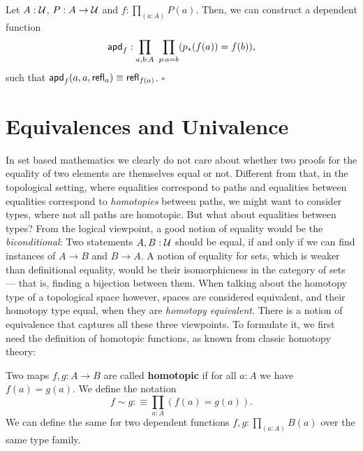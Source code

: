 \begin{lemma}
Let $A : \mathcal{U}$, $P : A \to \mathcal{U}$ and $f : \prod_{(a : A)} P(a)$. Then, we can construct
a dependent function
\begin{equation*}
\mathsf{apd}_f : \prod_{a, b : A} ~ \prod_{p : a = b} (p_*(f(a)) = f(b)) \text{,}
\end{equation*}
such that $\mathsf{apd}_f(a, a, \mathsf{refl}_a) \equiv \mathsf{refl}_{f(a)}$. \hfill $\square$
\end{lemma}

\section{Equivalences and Univalence}

In set based mathematics we clearly do not care about whether two proofs for the
equality of two elements are themselves equal or not.
Different from that, in the topological setting, where equalities correspond to
paths and equalities between equalities correspond to \emph{homotopies} between
paths, we might want to consider types, where not all paths are homotopic.
But what about equalities between types?
From the logical viewpoint, a good notion of equality would be the \emph{biconditional}:
Two statements $A, B : \mathcal{U}$ should be equal, if and only if we can find
instances of $A \to B$ and $B \to A$.
A notion of equality for sets, which is weaker than definitional equality, would
be their isomorphicness in the category of sets --- that is, finding a bijection
between them.
When talking about the homotopy type of a topological space however, spaces are
considered equivalent, and their homotopy type equal, when they are \emph{homotopy
equivalent}.
There is a notion of equivalence that captures all these three viewpoints.
To formulate it, we first need the definition of homotopic functions, as known
from classic homotopy theory:

\begin{defn} \label{def:htpy-hott}
Two maps $f, g : A \to B$ are called \textbf{homotopic} if for all $a : A$ we have
$f(a) = g(a)$.
We define the notation
\begin{equation*}
f \sim g :\equiv \prod_{a : A} (f(a) = g(a)) \text{.}
\end{equation*}
We can define the same for two dependent functions $f, g : \prod_{(a : A)} B(a)$
over the same type family.
\end{defn}

